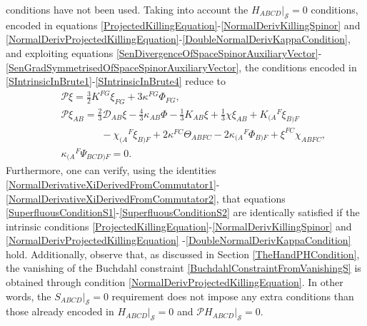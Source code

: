 \documentclass[10pt,a4paper]{article}
\theoremstyle{plain}
\begin{document}
conditions have not been used. Taking into account the
$H_{ABCD}|_{\mathcal{S}}=0$ conditions, encoded in equations
\eqref{ProjectedKillingEquation}-\eqref{NormalDerivKillingSpinor} and
\eqref{NormalDerivProjectedKillingEquation}-\eqref{DoubleNormalDerivKappaCondition},
and exploiting equations
\eqref{SenDivergenceOfSpaceSpinorAuxiliaryVector}-\eqref{SenGradSymmetrisedOfSpaceSpinorAuxiliaryVector},
the conditions encoded in
\eqref{SIntrinsicInBrute1}-\eqref{SIntrinsicInBrute4} reduce to
\begin{subequations}
\begin{eqnarray}
&& \mathcal{P}\xi = \tfrac{3}{2}K^{FG}\xi_{FG}+3\kappa^{FG}\Phi_{FG},
\label{SuperfluousConditionS1} \\
&& \mathcal{P}\xi_{AB} =\tfrac{2}{3} \mathcal{D}_{AB}\xi- \tfrac{4}{3}
\kappa_{AB} \Phi - \tfrac{1}{3} K_{AB} \xi + \tfrac{1}{3} \chi
\xi_{AB} + K_{(A}{}^{F} \xi_{B)F} \nonumber\\ &&\qquad\qquad -
\chi_{(A}{}^{F} \xi_{B)F} +2 \kappa^{FC} \Theta_{ABFC} -
2\kappa_{(A}{}^{F} \Phi_{B)F} + \xi^{FC} \chi_{ABFC}
, \label{SuperfluousConditionS2}\\
&&
\kappa_{(A}{}^{F}\Psi_{BCD)F}=0.\label{BuchdahlConstraintFromVanishingS}
\end{eqnarray}
\end{subequations}
Furthermore, one can verify, using the identities
\eqref{NormalDerivativeXiDerivedFromCommutator1}-\eqref{NormalDerivativeXiDerivedFromCommutator2},
that equations
\eqref{SuperfluousConditionS1}-\eqref{SuperfluousConditionS2} are
identically satisfied if the intrinsic conditions
\eqref{ProjectedKillingEquation}-\eqref{NormalDerivKillingSpinor} and
\eqref{NormalDerivProjectedKillingEquation}
-\eqref{DoubleNormalDerivKappaCondition} hold.  Additionally, observe
that, as discussed in Section \ref{TheHandPHCondition}, the vanishing
of the Buchdahl constraint \eqref{BuchdahlConstraintFromVanishingS} is
obtained through condition
\eqref{NormalDerivProjectedKillingEquation}. In other words, the
$S_{ABCD}|_{\mathcal{S}}=0$ requirement does not impose any extra
conditions than those already encoded in $H_{ABCD}|_{\mathcal{S}}=0$
and $\mathcal{P}H_{ABCD}|_{\mathcal{S}}=0$.

\medskip
\end{document}
